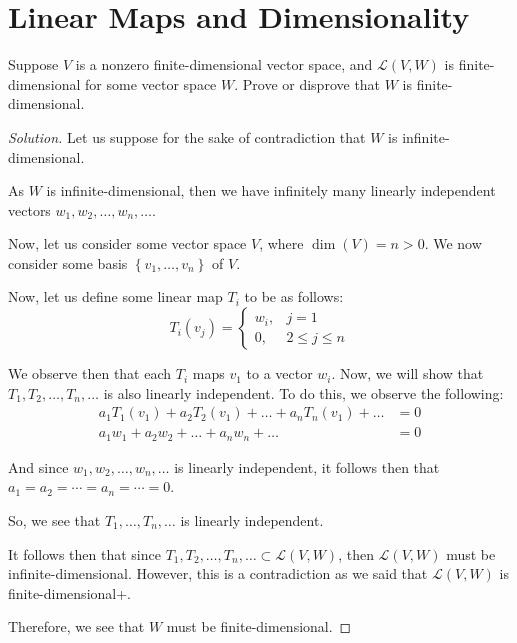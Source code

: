 \documentclass{article}
\newenvironment{solution}{\begin{proof}[Solution]}{\end{proof}}
\begin{document}
	\section{Linear Maps and Dimensionality}
	\begin{hw}
		Suppose $V$ is a nonzero finite-dimensional vector space, and $\mathcal{L}(V,W)$ is finite-dimensional for some vector space $W$. Prove or disprove that $W$ is finite-dimensional.
	\end{hw}
	\begin{solution}
		Let us suppose for the sake of contradiction that $W$ is infinite-dimensional.
		
		As $W$ is infinite-dimensional, then we have infinitely many linearly independent vectors $w_{1}, w_{2}, \ldots, w_{n}, \ldots$. 
		
		Now, let us consider some vector space $V$, where $\dim(V) = n > 0$. We now consider some basis $\left\{  v_{1}, \ldots, v_{n} \right\}$ of $V$.
		
		Now, let us define some linear map $T_{i}$ to be as follows:
		\begin{equation*}
			T_{i}(v_{j}) = 
			\begin{cases}
				w_{i}, & j = 1 \\
				0, & 2 \leq j \leq n
			\end{cases}
		\end{equation*}
	
		We observe then that each $T_{i}$ maps $v_{1}$ to a vector $w_{i}$. Now, we will show that $T_{1}, T_{2}, \ldots, T_{n}, \ldots$ is also linearly independent. To do this, we observe the following:
		\begin{align*}
			a_{1}T_{1}(v_{1}) + a_{2}T_{2}(v_{1}) + \ldots + a_{n}T_{n}(v_{1}) + \ldots &= 0 \\
			a_{1}w_{1} + a_{2}w_{2} + \ldots + a_{n}w_{n} + \ldots &= 0
		\end{align*}
	
		And since $w_{1}, w_{2}, \ldots, w_{n}, \ldots$ is linearly independent, it follows then that $a_{1} = a_{2} = \cdots = a_{n} = \cdots = 0$.
		
		So, we see that $T_{1}, \ldots, T_{n}, \ldots$ is linearly independent.
		
		
		It follows then that since $T_{1}, T_{2}, \ldots, T_{n}, \ldots \subset \mathcal L(V, W)$, then $\mathcal L(V,W)$ must be infinite-dimensional. However, this is a contradiction as we said that $\mathcal L(V,W)$ is finite-dimensional+.
		
		Therefore, we see that $W$ must be finite-dimensional.
	\end{solution}
\end{document}
